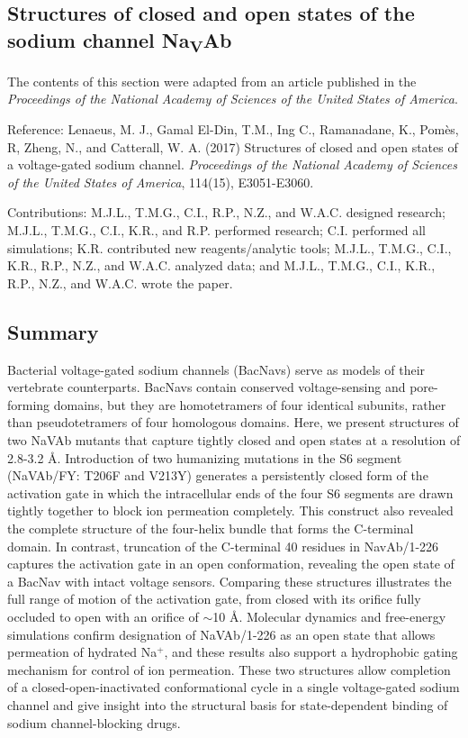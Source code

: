 \begin{refsection}
\chapter{Structures of closed and open states of the sodium channel Na\textsubscript{V}Ab}

The contents of this section were adapted from an article published in the \textit{Proceedings of the National Academy of Sciences of the United States of America}.\par
\bigskip
Reference: Lenaeus, M. J., Gamal El-Din, T.M., Ing C., Ramanadane, K., Pom\`es, R, Zheng, N., and Catterall, W. A. (2017) Structures of closed and open states of a voltage-gated sodium channel. \textit{Proceedings of the National Academy of Sciences of the United States of America}, 114(15), E3051-E3060.\par
\bigskip
Contributions: M.J.L., T.M.G., C.I., R.P., N.Z., and W.A.C. designed research; M.J.L., T.M.G., C.I., K.R., and R.P. performed research; C.I. performed all simulations; K.R. contributed new reagents/analytic tools; M.J.L., T.M.G., C.I., K.R., R.P., N.Z., and W.A.C. analyzed data; and M.J.L., T.M.G., C.I., K.R., R.P., N.Z., and W.A.C. wrote the paper.

\newpage

\section{Summary}

Bacterial voltage-gated sodium channels (BacNavs) serve as models of their vertebrate counterparts. BacNavs contain conserved voltage-sensing and pore-forming domains, but they are homotetramers of four identical subunits, rather than pseudotetramers of four homologous domains. Here, we present structures of two NaVAb mutants that capture tightly closed and open states at a resolution of 2.8-3.2 \AA. Introduction of two humanizing mutations in the S6 segment (NaVAb/FY: T206F and V213Y) generates a persistently closed form of the activation gate in which the intracellular ends of the four S6 segments are drawn tightly together to block ion permeation completely. This construct also revealed the complete structure of the four-helix bundle that forms the C-terminal domain. In contrast, truncation of the C-terminal 40 residues in NavAb/1-226 captures the activation gate in an open conformation, revealing the open state of a BacNav with intact voltage sensors. Comparing these structures illustrates the full range of motion of the activation gate, from closed with its orifice fully occluded to open with an orifice of $\sim$10 \AA. Molecular dynamics and free-energy simulations confirm designation of NaVAb/1-226 as an open state that allows permeation of hydrated Na$^+$, and these results also support a hydrophobic gating mechanism for control of ion permeation. These two structures allow completion of a closed-open-inactivated conformational cycle in a single voltage-gated sodium channel and give insight into the structural basis for state-dependent binding of sodium channel-blocking drugs.


\end{refsection}
